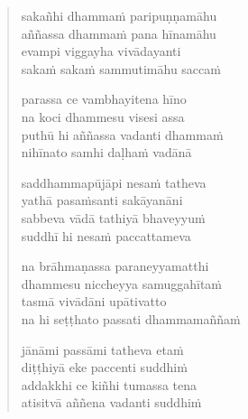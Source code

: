 \clearpage
\begin{verse}

sakañhi dhammaṁ paripuṇṇamāhu\\
aññassa dhammaṁ pana hīnamāhu\\
evampi viggayha vivādayanti\\
sakaṁ sakaṁ sammutimāhu saccaṁ

parassa ce vambhayitena hīno\\
na koci dhammesu visesi assa\\
puthū hi aññassa vadanti dhammaṁ\\
nihīnato samhi daḷhaṁ vadānā

saddhammapūjāpi nesaṁ tatheva\\
yathā pasaṁsanti sakāyanāni\\
sabbeva vādā tathiyā bhaveyyuṁ\\
suddhī hi nesaṁ paccattameva

na brāhmaṇassa paraneyyamatthi\\
dhammesu niccheyya samuggahītaṁ\\
tasmā vivādāni upātivatto\\
na hi seṭṭhato passati dhammamaññaṁ

jānāmi passāmi tatheva etaṁ\\
diṭṭhiyā eke paccenti suddhiṁ\\
addakkhi ce kiñhi tumassa tena\\
atisitvā aññena vadanti suddhiṁ

\end{verse}



